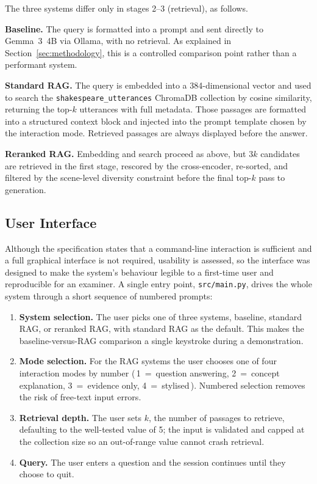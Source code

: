 The three systems differ only in stages 2--3 (retrieval), as follows.

\textbf{Baseline.} The query is formatted into a prompt and sent directly
to Gemma~3~4B via Ollama, with no retrieval. As explained in
Section~\ref{sec:methodology}, this is a controlled comparison point
rather than a performant system.

\textbf{Standard RAG.} The query is embedded into a 384-dimensional vector
and used to search the \texttt{shakespeare\_utterances} ChromaDB
collection by cosine similarity, returning the top-$k$ utterances with
full metadata. Those passages are formatted into a structured context
block and injected into the prompt template chosen by the interaction
mode. Retrieved passages are always displayed before the answer.

\textbf{Reranked RAG.} Embedding and search proceed as above, but $3k$
candidates are retrieved in the first stage, rescored by the
cross-encoder, re-sorted, and filtered by the scene-level diversity
constraint before the final top-$k$ pass to generation.

\subsection{User Interface}
Although the specification states that a command-line interaction is
sufficient and a full graphical interface is not required, usability is
assessed, so the interface was designed to make the system's behaviour
legible to a first-time user and reproducible for an examiner. A single
entry point, \texttt{src/main.py}, drives the whole system through a
short sequence of numbered prompts:

\begin{enumerate}
  \item \textbf{System selection.} The user picks one of three systems,
  baseline, standard RAG, or reranked RAG, with standard RAG as the
  default. This makes the baseline-versus-RAG comparison a single
  keystroke during a demonstration.
  \item \textbf{Mode selection.} For the RAG systems the user chooses one
  of four interaction modes by number (\,1~=~question answering,
  2~=~concept explanation, 3~=~evidence only, 4~=~stylised\,). Numbered
  selection removes the risk of free-text input errors.
  \item \textbf{Retrieval depth.} The user sets $k$, the number of
  passages to retrieve, defaulting to the well-tested value of 5; the
  input is validated and capped at the collection size so an out-of-range
  value cannot crash retrieval.
  \item \textbf{Query.} The user enters a question and the session
  continues until they choose to quit.
\end{enumerate}

